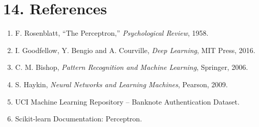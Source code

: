 \documentclass[11pt]{article}
\begin{document}
\section*{14. References}

\begin{enumerate}
\item F. Rosenblatt, ``The Perceptron,'' \emph{Psychological Review}, 1958.
\item I. Goodfellow, Y. Bengio and A. Courville, \emph{Deep Learning}, MIT Press, 2016.
\item C. M. Bishop, \emph{Pattern Recognition and Machine Learning}, Springer, 2006.
\item S. Haykin, \emph{Neural Networks and Learning Machines}, Pearson, 2009.
\item UCI Machine Learning Repository -- Banknote Authentication Dataset.
\item Scikit-learn Documentation: Perceptron.
\end{enumerate}
\end{document}
